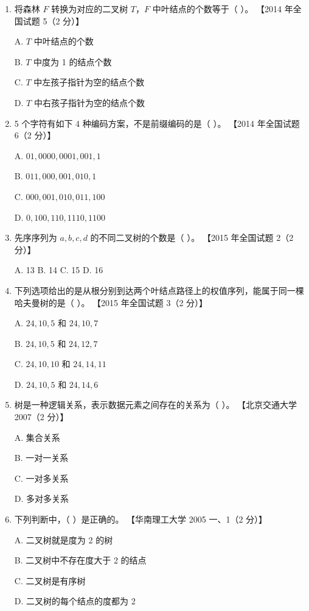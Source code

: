 \documentclass[lang=cn,newtx,10pt,scheme=chinese]{elegantbook}
\begin{document}
\begin{enumerate}
    \item 将森林 $F$ 转换为对应的二叉树 $T$，$F$ 中叶结点的个数等于（ ）。  
    【2014 年全国试题 5（2 分）】  

    A. $T$ 中叶结点的个数  

    B. $T$ 中度为 1 的结点个数  

    C. $T$ 中左孩子指针为空的结点个数  

    D. $T$ 中右孩子指针为空的结点个数  

    \item 5 个字符有如下 4 种编码方案，不是前缀编码的是（ ）。  
    【2014 年全国试题 6（2 分）】  

    A. $01, 0000, 0001, 001, 1$  

    B. $011, 000, 001, 010, 1$ 

    C. $000, 001, 010, 011, 100$  

    D. $0, 100, 110, 1110, 1100$  

    \item 先序序列为 $a, b, c, d$ 的不同二叉树的个数是（ ）。  
    【2015 年全国试题 2（2 分）】 

    A. 13 \quad B. 14 \quad C. 15 \quad D. 16  

    \item 下列选项给出的是从根分别到达两个叶结点路径上的权值序列，能属于同一棵哈夫曼树的是（ ）。  
    【2015 年全国试题 3（2 分）】  

    A. $24, 10, 5$ 和 $24, 10, 7$

    B. $24, 10, 5$ 和 $24, 12, 7$  

    C. $24, 10, 10$ 和 $24, 14, 11$  

    D. $24, 10, 5$ 和 $24, 14, 6$  

    \item 树是一种逻辑关系，表示数据元素之间存在的关系为（ ）。  
    【北京交通大学 2007（2 分）】  

    A. 集合关系  

    B. 一对一关系  

    C. 一对多关系  

    D. 多对多关系  

    \item 下列判断中，（ ）是正确的。  
    【华南理工大学 2005 一、1（2 分）】  

    A. 二叉树就是度为 2 的树  

    B. 二叉树中不存在度大于 2 的结点  

    C. 二叉树是有序树  

    D. 二叉树的每个结点的度都为 2  


\end{enumerate}
\end{document}
